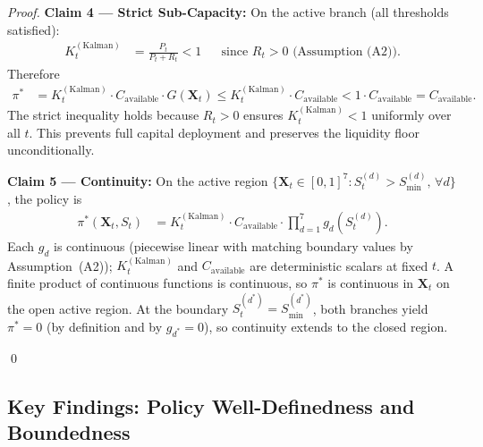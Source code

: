 \documentclass[12pt,openany]{book}
\numberwithin{equation}{chapter}
\theoremstyle{plain}
\theoremstyle{definition}
\theoremstyle{remark}
\def\mathcal#1{#1}%
\begin{document}
\begin{proof}
\medskip
\noindent\textbf{Claim 4 --- Strict Sub-Capacity:}
On the active branch (all thresholds satisfied):
\begin{align}
  K_t^{(\mathrm{Kalman})}
  &= \frac{P_t}{P_t + R_t} < 1
  &&\text{since } R_t > 0 \text{ (Assumption (A2))}.
\end{align}
Therefore
\begin{align}
  \pi^*
  &= K_t^{(\mathrm{Kalman})}
     \cdot C_{\mathrm{available}}
     \cdot G(\mathbf{X}_t)
   \leq K_t^{(\mathrm{Kalman})}
     \cdot C_{\mathrm{available}}
   < 1 \cdot C_{\mathrm{available}}
   = C_{\mathrm{available}}.
\end{align}
The strict inequality holds because $R_t > 0$ ensures
$K_t^{(\mathrm{Kalman})} < 1$ uniformly over all $t$.
This prevents full capital deployment and preserves
the liquidity floor unconditionally.

\medskip
\noindent\textbf{Claim 5 --- Continuity:}
On the active region
$\{\mathbf{X}_t \in [0,1]^7 :
  \mathcal{S}_t^{(d)} > \mathcal{S}_{\min}^{(d)},\, \forall d\}$,
the policy is
\begin{align}
  \pi^*(\mathbf{X}_t, S_t)
  &= K_t^{(\mathrm{Kalman})}
     \cdot C_{\mathrm{available}}
     \cdot \prod_{d=1}^{7} g_d\!\left(\mathcal{S}_t^{(d)}\right).
\end{align}
Each $g_d$ is continuous (piecewise linear with matching
boundary values by Assumption~(A2));
$K_t^{(\mathrm{Kalman})}$ and $C_{\mathrm{available}}$ are
deterministic scalars at fixed $t$.  A finite product of
continuous functions is continuous, so $\pi^*$ is continuous
in $\mathbf{X}_t$ on the open active region.  At the boundary
$\mathcal{S}_t^{(d^*)} = \mathcal{S}_{\min}^{(d^*)}$,
both branches yield $\pi^* = 0$ (by definition and by
$g_{d^*} = 0$), so continuity extends to the closed region.

\qed
\end{proof}

\subsection*{Key Findings: Policy Well-Definedness and Boundedness}
\end{document}
